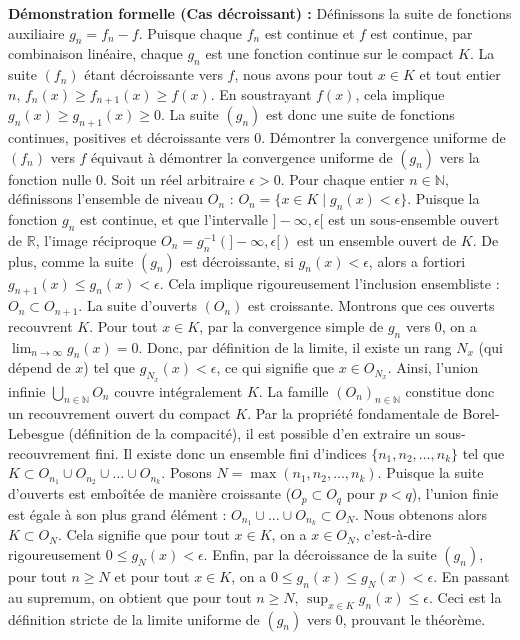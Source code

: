 \documentclass{report}
\begin{document}
\textbf{Démonstration formelle (Cas décroissant) :}
Définissons la suite de fonctions auxiliaire $g_n = f_n - f$.
Puisque chaque $f_n$ est continue et $f$ est continue, par combinaison linéaire, chaque $g_n$ est une fonction continue sur le compact $K$.
La suite $(f_n)$ étant décroissante vers $f$, nous avons pour tout $x \in K$ et tout entier $n$, $f_n(x) \geq f_{n+1}(x) \geq f(x)$.
En soustrayant $f(x)$, cela implique $g_n(x) \geq g_{n+1}(x) \geq 0$. La suite $(g_n)$ est donc une suite de fonctions continues, positives et décroissante vers 0.
Démontrer la convergence uniforme de $(f_n)$ vers $f$ équivaut à démontrer la convergence uniforme de $(g_n)$ vers la fonction nulle 0.
Soit un réel arbitraire $\epsilon > 0$.
Pour chaque entier $n \in \mathbb{N}$, définissons l'ensemble de niveau $O_n$ :
$O_n = \{x \in K \mid g_n(x) < \epsilon\}$.
Puisque la fonction $g_n$ est continue, et que l'intervalle $]-\infty, \epsilon[$ est un sous-ensemble ouvert de $\mathbb{R}$, l'image réciproque $O_n = g_n^{-1}(]-\infty, \epsilon[)$ est un ensemble ouvert de $K$.
De plus, comme la suite $(g_n)$ est décroissante, si $g_n(x) < \epsilon$, alors a fortiori $g_{n+1}(x) \leq g_n(x) < \epsilon$. Cela implique rigoureusement l'inclusion ensembliste : $O_n \subset O_{n+1}$. La suite d'ouverts $(O_n)$ est croissante.
Montrons que ces ouverts recouvrent $K$. Pour tout $x \in K$, par la convergence simple de $g_n$ vers 0, on a $\lim_{n \to \infty} g_n(x) = 0$. Donc, par définition de la limite, il existe un rang $N_x$ (qui dépend de $x$) tel que $g_{N_x}(x) < \epsilon$, ce qui signifie que $x \in O_{N_x}$.
Ainsi, l'union infinie $\bigcup_{n \in \mathbb{N}} O_n$ couvre intégralement $K$.
La famille $(O_n)_{n \in \mathbb{N}}$ constitue donc un recouvrement ouvert du compact $K$.
Par la propriété fondamentale de Borel-Lebesgue (définition de la compacité), il est possible d'en extraire un sous-recouvrement fini. Il existe donc un ensemble fini d'indices $\{n_1, n_2, \dots, n_k\}$ tel que $K \subset O_{n_1} \cup O_{n_2} \cup \dots \cup O_{n_k}$.
Posons $N = \max(n_1, n_2, \dots, n_k)$. Puisque la suite d'ouverts est emboîtée de manière croissante ($O_p \subset O_q$ pour $p < q$), l'union finie est égale à son plus grand élément : $O_{n_1} \cup \dots \cup O_{n_k} \subset O_N$.
Nous obtenons alors $K \subset O_N$.
Cela signifie que pour tout $x \in K$, on a $x \in O_N$, c'est-à-dire rigoureusement $0 \leq g_N(x) < \epsilon$.
Enfin, par la décroissance de la suite $(g_n)$, pour tout $n \geq N$ et pour tout $x \in K$, on a $0 \leq g_n(x) \leq g_N(x) < \epsilon$.
En passant au supremum, on obtient que pour tout $n \geq N$, $\sup_{x \in K} g_n(x) \leq \epsilon$.
Ceci est la définition stricte de la limite uniforme de $(g_n)$ vers 0, prouvant le théorème.
\end{document}
